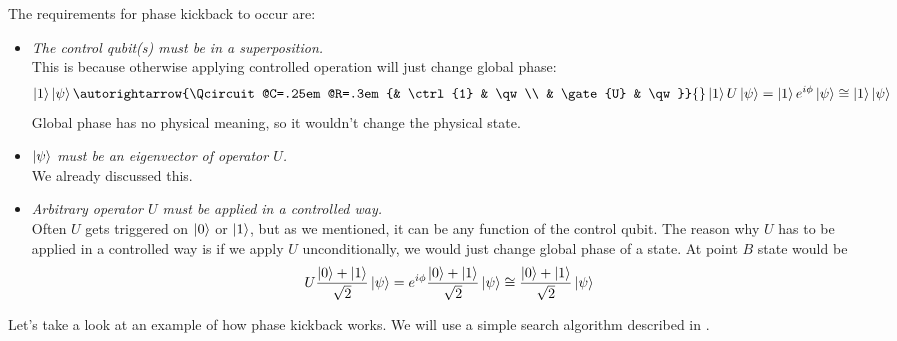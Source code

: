 \documentclass[12pt,twoside,a4paper]{article}
\begin{document}
The requirements for phase kickback to occur are:
\begin{itemize}
        \item \emph{The control qubit(s) must be in a superposition.} \\
        This is because otherwise applying controlled operation will just change global phase:
\begin{equation*}
        \ket{1} \ket{\psi} \autorightarrow{\Qcircuit @C=.25em @R=.3em {& \ctrl{1} & \qw \\ & \gate{U} & \qw}}{} \ket{1} U \ket{\psi} = \ket{1} e^{i\phi} \ket{\psi} \cong \ket{1} \ket{\psi}
\end{equation*}
        Global phase has no physical meaning, so it wouldn't change the physical state.
        \item \emph{$\ket{\psi}$ must be an eigenvector of operator $U$.} \\
        We already discussed this.
        \item \emph{Arbitrary operator $U$ must be applied in a controlled way.} \\
        Often $U$ gets triggered on $\ket{0}$ or $\ket{1}$, but as we mentioned, it can be any function of the control qubit.
        The reason why $U$ has to be applied in a controlled way is if we apply $U$ unconditionally, we would just change global phase of a state.
        At point $B$ state would be
        \begin{equation*}
                U \frac{\ket{0} + \ket{1}}{\sqrt{2}} \ket{\psi}
                = e^{i\phi} \frac{\ket{0} + \ket{1}}{\sqrt{2}} \ket{\psi}
                \cong \frac{\ket{0} + \ket{1}}{\sqrt{2}} \ket{\psi}
        \end{equation*}
\end{itemize}

Let's take a look at an example of how phase kickback works.
We will use a simple search algorithm described in \cite{watrous5}.
\end{document}
